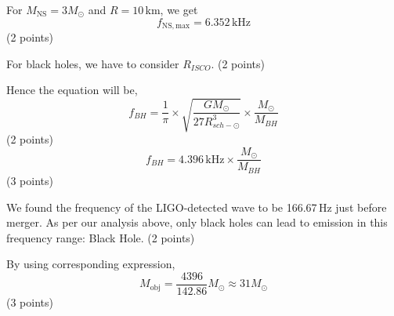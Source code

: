 \begin{description}
  For $M_{\mathrm{NS}} = 3M_\odot$ and $R = 10$\,km, we get
  \[ f_{\mathrm{NS,max}} = 6.352\,\mathrm{kHz} \]
  \hfill(2 points)

\item[(T11.6)] For black holes, we have to consider $R_{ISCO}$.
  \hfill(2 points)

  Hence the equation will be,
  \[ f_{BH} = \frac{1}{\pi} \times
     \sqrt{\frac{G M_\odot}{27 R_{sch-\odot}^3}} \times
     \frac{M_\odot}{M_{BH}} \]
  \hfill(2 points)
  \[ f_{BH} = 4.396\,\mathrm{kHz} \times \frac{M_\odot}{M_{BH}} \]
  \hfill(3 points)

\item[(T11.7)] We found the frequency of the LIGO-detected wave to be
  166.67\,Hz just before merger.
  As per our analysis above, only black holes can lead to emission in this
  frequency range: Black Hole. \hfill(2 points)

  By using corresponding expression,
  \[ M_{\mathrm{obj}} = \frac{4396}{142.86} M_\odot \approx 31 M_\odot \]
  \hfill(3 points)
\end{description}
